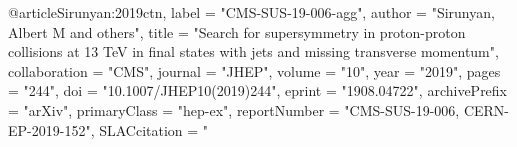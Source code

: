 @article{Sirunyan:2019ctn,
      label          = "CMS-SUS-19-006-agg",
      author         = "Sirunyan, Albert M and others",
      title          = "{Search for supersymmetry in proton-proton collisions at
                        13 TeV in final states with jets and missing transverse
                        momentum}",
      collaboration  = "CMS",
      journal        = "JHEP",
      volume         = "10",
      year           = "2019",
      pages          = "244",
      doi            = "10.1007/JHEP10(2019)244",
      eprint         = "1908.04722",
      archivePrefix  = "arXiv",
      primaryClass   = "hep-ex",
      reportNumber   = "CMS-SUS-19-006, CERN-EP-2019-152",
      SLACcitation   = "%
}

